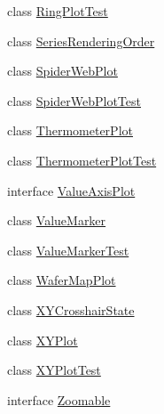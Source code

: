 \begin{DoxyCompactItemize}
class \mbox{\hyperlink{classorg_1_1jfree_1_1chart_1_1plot_1_1_ring_plot_test}{Ring\+Plot\+Test}}
\item 
class \mbox{\hyperlink{classorg_1_1jfree_1_1chart_1_1plot_1_1_series_rendering_order}{Series\+Rendering\+Order}}
\item 
class \mbox{\hyperlink{classorg_1_1jfree_1_1chart_1_1plot_1_1_spider_web_plot}{Spider\+Web\+Plot}}
\item 
class \mbox{\hyperlink{classorg_1_1jfree_1_1chart_1_1plot_1_1_spider_web_plot_test}{Spider\+Web\+Plot\+Test}}
\item 
class \mbox{\hyperlink{classorg_1_1jfree_1_1chart_1_1plot_1_1_thermometer_plot}{Thermometer\+Plot}}
\item 
class \mbox{\hyperlink{classorg_1_1jfree_1_1chart_1_1plot_1_1_thermometer_plot_test}{Thermometer\+Plot\+Test}}
\item 
interface \mbox{\hyperlink{interfaceorg_1_1jfree_1_1chart_1_1plot_1_1_value_axis_plot}{Value\+Axis\+Plot}}
\item 
class \mbox{\hyperlink{classorg_1_1jfree_1_1chart_1_1plot_1_1_value_marker}{Value\+Marker}}
\item 
class \mbox{\hyperlink{classorg_1_1jfree_1_1chart_1_1plot_1_1_value_marker_test}{Value\+Marker\+Test}}
\item 
class \mbox{\hyperlink{classorg_1_1jfree_1_1chart_1_1plot_1_1_wafer_map_plot}{Wafer\+Map\+Plot}}
\item 
class \mbox{\hyperlink{classorg_1_1jfree_1_1chart_1_1plot_1_1_x_y_crosshair_state}{X\+Y\+Crosshair\+State}}
\item 
class \mbox{\hyperlink{classorg_1_1jfree_1_1chart_1_1plot_1_1_x_y_plot}{X\+Y\+Plot}}
\item 
class \mbox{\hyperlink{classorg_1_1jfree_1_1chart_1_1plot_1_1_x_y_plot_test}{X\+Y\+Plot\+Test}}
\item 
interface \mbox{\hyperlink{interfaceorg_1_1jfree_1_1chart_1_1plot_1_1_zoomable}{Zoomable}}
\end{DoxyCompactItemize}
